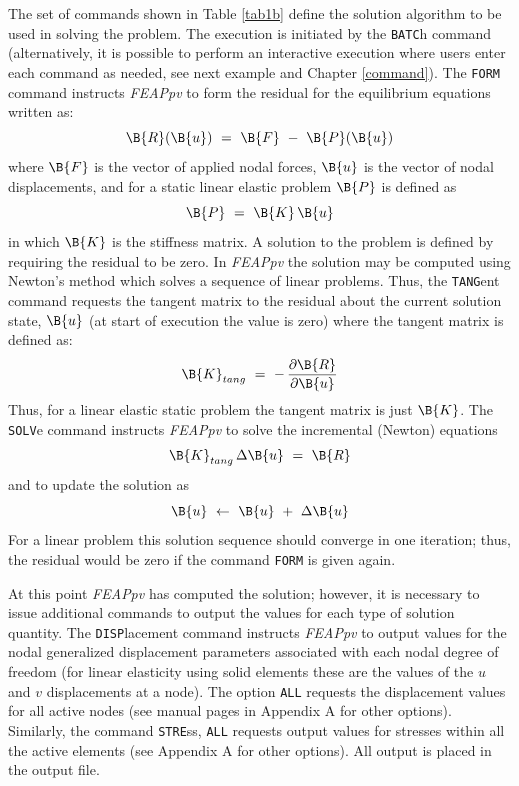 The set of commands shown in Table \ref{tab1b}
define the solution algorithm to be used in solving the
problem.  The execution is initiated by the {\tt BATC}h command
(alternatively, it
is possible to perform an interactive execution where users enter each
command as needed, see next example and
Chapter \ref{command}).  The {\tt FORM} command instructs {\sl FEAPpv}
to form the residual for the equilibrium equations written as:
$$\B{R} ( \B{u} ) ~=~ \B{F} ~-~ \B{P}( \B{u} )$$
where $\B{F}$ is the vector of applied nodal forces,
$\B{u}$ is the vector of nodal displacements, and
for a static linear elastic problem $\B{P}$ is defined as
\begin{equation}
\B{P} ~=~ \B{K} \, \B{u}
\end{equation}
in which $\B{K}$ is the stiffness matrix.
A solution to the problem is defined by requiring the residual to be zero.
In {\sl FEAPpv} the solution may be computed using Newton's method which solves
a sequence of linear problems.
Thus, the {\tt TANG}ent command
requests the tangent matrix to the residual about the current solution state,
$\B{u}$ (at start of execution
the value is zero)
where the tangent matrix is defined as:
\begin{equation}
\B{K}_{tang} ~=~ - \, \frac{\partial \B{R}}{\partial \B{u}}
\end{equation}
Thus, for a linear elastic
static problem the tangent matrix is just $\B{K}$.
The {\tt SOLV}e command instructs {\sl FEAPpv} to solve
the incremental (Newton) equations
\begin{equation}
\B{K}_{tang} \, \Delta \B{u} ~=~ \B{R}
\end{equation}
and to update the solution as
\begin{equation}
\B{u} ~ \leftarrow ~ \B{u} ~+~ \Delta \B{u}
\end{equation}
For a linear problem this solution sequence should converge in one iteration;
thus, the residual would be zero if the command {\tt FORM} is given again.

At this point {\sl FEAPpv} has computed the solution; however, it is necessary
to issue additional commands to output the values for each type of solution
quantity.
The {\tt DISP}\-lace\-ment command instructs {\sl FEAPpv} to output values for
the nodal generalized displacement parameters associated with each nodal
degree of freedom (for linear elasticity using solid elements these are
the values of the $u$ and $v$ displacements at a node).
The option {\tt ALL} requests the displacement
values for all active nodes (see manual
pages in Appendix A for other options).  Similarly, the command
{\tt STRE}ss, {\tt ALL} requests output values for
stresses within all the active elements (see Appendix A for other options).
All output is placed in the output file.

